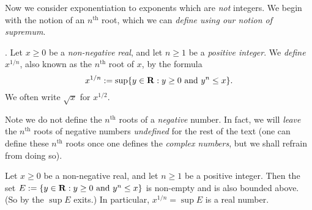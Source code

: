 Now we consider exponentiation to exponents which are \emph{not} integers.
We begin with the notion of an \(n^{\text{th}}\) root, which we can \emph{define using our notion of supremum}.

\begin{definition} \label{def 5.6.4}.
Let \(x \ge 0\) be a \emph{non-negative} \emph{real}, and let \(n \ge 1\) be a \emph{positive integer}.
We \emph{define} \(x^{1/n}\), also known as the \(n^{\text{th}}\) root of \(x\), by the
formula
\[
    x^{1 / n} := \sup \{y \in \mathbf{R} : y \ge 0 \text{ and } y^n \le x\}.
\]
We often write \(\sqrt{x}\) for \(x^{1/2}\).
\end{definition}

\begin{note}
Note we do not define the \(n^{\text{th}}\) roots of a \emph{negative} number.
In fact, we will \emph{leave} the \(n^{\text{th}}\) roots of negative numbers \emph{undefined} for the rest of the text
(one can define these \(n^{\text{th}}\) roots once one defines the \emph{complex numbers}, but we shall refrain from doing so).
\end{note}

\begin{lemma}  \label{lem 5.6.5}
Let \(x \ge 0\) be a non-negative real, and let \(n \ge 1\) be a positive integer.
Then the set \(E := \{ y \in \mathbf{R} : y \ge 0 \text{ and } y^n \le x \} \) is non-empty and is also bounded above. (So by  the \(\sup E\) exits.)
In particular, \(x^{1/n} = \sup E\) is a real number.
\end{lemma}

